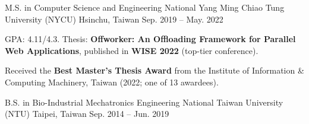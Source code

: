 
\begin{cventries}

  
\cventry
  {M.S. in Computer Science and Engineering} %
  {National Yang Ming Chiao Tung University (NYCU)} %
  {Hsinchu, Taiwan} %
  {Sep. 2019 -- May. 2022} %
  {
    \begin{cvitems} %
  \item {GPA: 4.11/4.3. Thesis: \textbf{Offworker: An Offloading Framework for Parallel Web Applications}, published in \textbf{WISE 2022} (top-tier conference).}
  \item {Received the \textbf{Best Master's Thesis Award} from the Institute of Information \& Computing Machinery, Taiwan (2022; one of 13 awardees).}
    \end{cvitems}
  }

  \vspace{2mm}


\cventry
    {B.S. in Bio-Industrial Mechatronics Engineering} %
    {National Taiwan University (NTU)} %
    {Taipei, Taiwan} %
  {Sep. 2014 -- Jun. 2019} %
    {}
  \vspace{-8mm}

\end{cventries}
